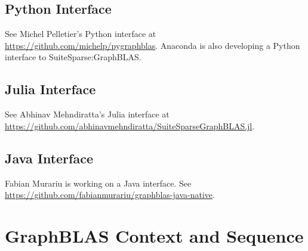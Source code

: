 \documentclass[12pt]{article}
\begin{document}
\subsection{Python Interface} %
\label{python}

See Michel Pelletier's Python interface at
\href{https://github.com/michelp/pygraphblas}{https://github.com/michelp/pygraphblas}.
Anaconda is also developing a Python interface to SuiteSparse:GraphBLAS.

\subsection{Julia Interface} %
\label{julia}

See Abhinav Mehndiratta's Julia interface at  \\
\href{https://github.com/abhinavmehndiratta/SuiteSparseGraphBLAS.jl}{https://github.com/abhinavmehndiratta/SuiteSparseGraphBLAS.jl}.

\subsection{Java Interface} %
\label{java}

Fabian Murariu is working on a Java interface.
See \newline
\href{https://github.com/fabianmurariu/graphblas-java-native}{https://github.com/fabianmurariu/graphblas-java-native}.

\newpage
\section{GraphBLAS Context and Sequence} %
\label{context}
\end{document}
